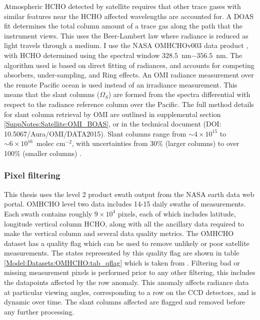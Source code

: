   Atmospheric HCHO detected by satellite requires that other trace gases with similar features near the HCHO affected wavelengths are accounted for.
  A DOAS fit determines the total column amount of a trace gas along the path that the instrument views.
  This uses the Beer-Lambert law where radiance is reduced as light travels through a medium.
  I use the NASA OMHCHOv003 data product \parencite{Abad2015}, with HCHO determined using the spectral window $328.5$~nm$ - 356.5$~nm. 
  The algorithm used is based on direct fitting of radiances, and accounts for competing absorbers, under-sampling, and Ring effects.
  An OMI radiance measurement over the remote Pacific ocean is used instead of an irradiance measurement.
  This means that the slant columns ($\Omega_S$) are formed from the spectra differential with respect to the radiance reference column over the Pacific.
  The full method details for slant column retrieval by OMI are outlined in supplemental section \ref{SuppNotes:Satellite:OMI_BOAS}, or in the technical document (DOI: 10.5067/Aura/OMI/DATA2015).
  Slant columns range from $\sim 4\times 10^{15} $ to $\sim 6 \times 10^{16}$~molec cm$^{-2}$, with uncertainties from 30\% (larger columns) to over 100\% (smaller columns) \parencite{Abad2015}.
  
  \subsubsection{Pixel filtering}
  \label{Model:omhcho:pixel_filtering}
  
  This thesis uses the level 2 product swath output from the NASA earth data web portal.
  OMHCHO level two data includes 14-15 daily swaths of measurements.
  Each swath contains roughly $9 \times 10^4$ pixels, each of which includes latitude, longitude vertical column HCHO, along with all the ancillary data required to make the vertical column and several data quality metrics.
  The OMHCHO dataset has a quality flag which can be used to remove unlikely or poor satellite measurements.
  The states represented by this quality flag are shown in table \ref{Model:Datasets:OMHCHO:tab_qflag} which is taken from \textcite{Kurosu2014}.
  Filtering bad or missing measurement pixels is performed prior to any other filtering, this includes the datapoints affected by the row anomaly.
  This anomaly \parencite{rowanomaly_url} affects radiance data at particular viewing angles, corresponding to a row on the CCD detectors, and is dynamic over time.
  The slant columns affected are flagged and removed before any further processing.
  
